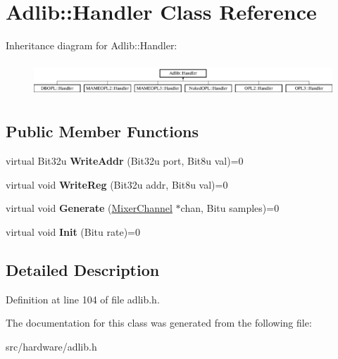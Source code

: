 \hypertarget{classAdlib_1_1Handler}{\section{Adlib\-:\-:Handler Class Reference}
\label{classAdlib_1_1Handler}
}
Inheritance diagram for Adlib\-:\-:Handler\-:\begin{figure}[H]
\begin{center}
\leavevmode
\includegraphics[height=1.314554cm]{classAdlib_1_1Handler}
\end{center}
\end{figure}
\subsection*{Public Member Functions}
\begin{DoxyCompactItemize}
\item 
\hypertarget{classAdlib_1_1Handler_aecfd94a9fc9c688bdb4029610f12cc8f}{virtual Bit32u {\bfseries Write\-Addr} (Bit32u port, Bit8u val)=0}\label{classAdlib_1_1Handler_aecfd94a9fc9c688bdb4029610f12cc8f}

\item 
\hypertarget{classAdlib_1_1Handler_a002f7eb216a517e9e1afa258fd9646fc}{virtual void {\bfseries Write\-Reg} (Bit32u addr, Bit8u val)=0}\label{classAdlib_1_1Handler_a002f7eb216a517e9e1afa258fd9646fc}

\item 
\hypertarget{classAdlib_1_1Handler_a1bde8d54a3e567e256b969c5ae1c3e3c}{virtual void {\bfseries Generate} (\hyperlink{classMixerChannel}{Mixer\-Channel} $\ast$chan, Bitu samples)=0}\label{classAdlib_1_1Handler_a1bde8d54a3e567e256b969c5ae1c3e3c}

\item 
\hypertarget{classAdlib_1_1Handler_acfb5d8e5e01a30b2ffb6efe99be71844}{virtual void {\bfseries Init} (Bitu rate)=0}\label{classAdlib_1_1Handler_acfb5d8e5e01a30b2ffb6efe99be71844}

\end{DoxyCompactItemize}


\subsection{Detailed Description}


Definition at line 104 of file adlib.\-h.



The documentation for this class was generated from the following file\-:\begin{DoxyCompactItemize}
\item 
src/hardware/adlib.\-h\end{DoxyCompactItemize}
